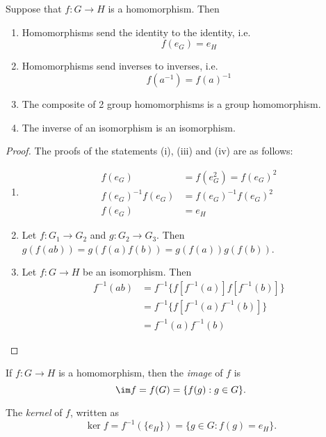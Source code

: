 \documentclass[a4pape]{article}
\begin{document}
\begin{prop}
  Suppose that $f: G\rightarrow H$ is a homomorphism. Then
  \begin{enumerate}
  \item Homomorphisms send the identity to the identity, i.e.
    \[
    f(e_G) = e_H
    \]
  \item Homomorphisms send inverses to inverses, i.e.
    \[
    f(a^{-1}) = f(a)^{-1}
    \]
  \item The composite of 2 group homomorphisms is a group homomorphism.
  \item The inverse of an isomorphism is an isomorphism.
  \end{enumerate}
\end{prop}
\begin{proof}
  The proofs of the statements (i), (iii) and (iv) are as follows:
  \begin{enumerate}
    \item \begin{align*}
      f(e_G) &= f(e_G^2) = f(e_G)^2\\
      f(e_G)^{-1}f(e_G) &= f(e_G)^{-1}f(e_G)^2\\
      f(e_G) &= e_H
    \end{align*}
    \setcounter{enumi}{2}
    \item Let $f:G_1 \rightarrow G_2$ and $g:G_2 \rightarrow G_3$. Then $g(f(ab)) = g(f(a)f(b)) = g(f(a))g(f(b))$.
    \item Let $f:G \rightarrow H$ be an isomorphism. Then
      \begin{align*}
        f^{-1}(ab) &= f^{-1}\{f[f^{-1}(a)]f[f^{-1}(b)]\}\\
        &= f^{-1}\{f[f^{-1}(a)f^{-1}(b)]\}\\
        &= f^{-1}(a)f^{-1}(b)
      \end{align*}
  \end{enumerate}
\end{proof}

\begin{defi}
  If $f:G\rightarrow H$ is a homomorphism, then the \emph{image} of $f$ is
  \[
  \im f = f(G) = \{f(g):g\in G\}.
  \]
\end{defi}

\begin{defi}
  The \emph{kernel} of $f$, written as
  \[
  \ker f = f^{-1}(\{e_H\}) = \{g\in G:f(g)=e_H\}.
  \]
\end{defi}
\end{document}
